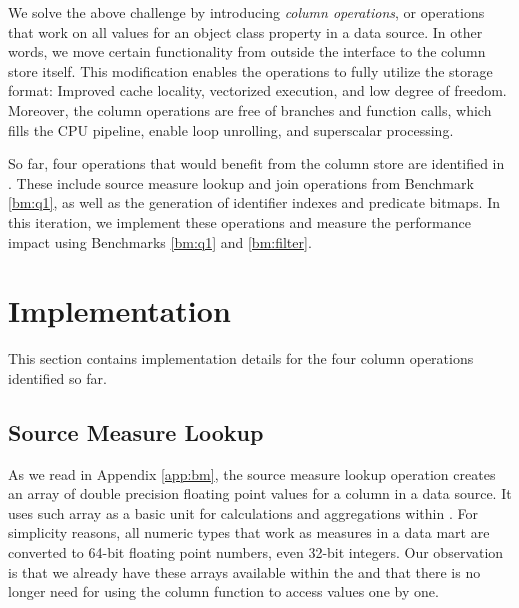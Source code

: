 We solve the above challenge by introducing \textit{column operations}, or operations that work on all values for an object class property in a data source. In other words, we move certain functionality from outside the  interface to the column store itself. This modification enables the operations to fully utilize the storage format: Improved cache locality, vectorized execution, and low degree of freedom. Moreover, the column operations are free of branches and function calls, which fills the CPU pipeline, enable loop unrolling, and superscalar processing.

So far, four operations that would benefit from the column store are identified in \gap. These include source measure lookup and join operations from Benchmark \ref{bm:q1}, as well as the generation of identifier indexes and predicate bitmaps. In this iteration, we implement these operations and measure the performance impact using Benchmarks \ref{bm:q1} and \ref{bm:filter}.






\section{Implementation}
\label{sec:Implementation}
This section contains implementation details for the four column operations identified so far.


\subsection{Source Measure Lookup}
\label{sub:Source Measure Lookup}
As we read in Appendix \ref{app:bm}, the source measure lookup operation creates an array of double precision floating point values for a column in a data source. It uses such array as a basic unit for calculations and aggregations within \gd. For simplicity reasons, all numeric types that work as measures in a data mart are converted to 64-bit floating point numbers, even 32-bit integers. Our observation is that we already have these arrays available within the  and that there is no longer need for using the column  function to access values one by one.

